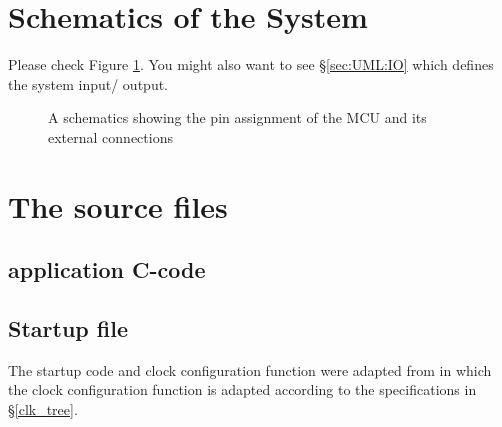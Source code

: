 \documentclass[12pt,a4paper]{scrartcl}
\begin{document}
	\section{Schematics of the System}
		Please check Figure \ref{fig:pin_connection}. You might also want to see \S \ref{sec:UML:IO} which defines the system input/ output.
		\begin{figure}[H]
			\centering
			
			\caption{A schematics showing the pin assignment of the MCU and its external connections}
			\label{fig:pin_connection}
		\end{figure}
	
	\section{The source files}	
	\subsection{application C-code} \label{app:src_code:app}
		
	\subsection{Startup file} \label{app:startup}
		The startup code and clock configuration function 
		were adapted from \cite{ASM} in which
		the clock configuration function is adapted according to the specifications in \S \ref{clk_tree}.
		
		
		 
\end{document}
